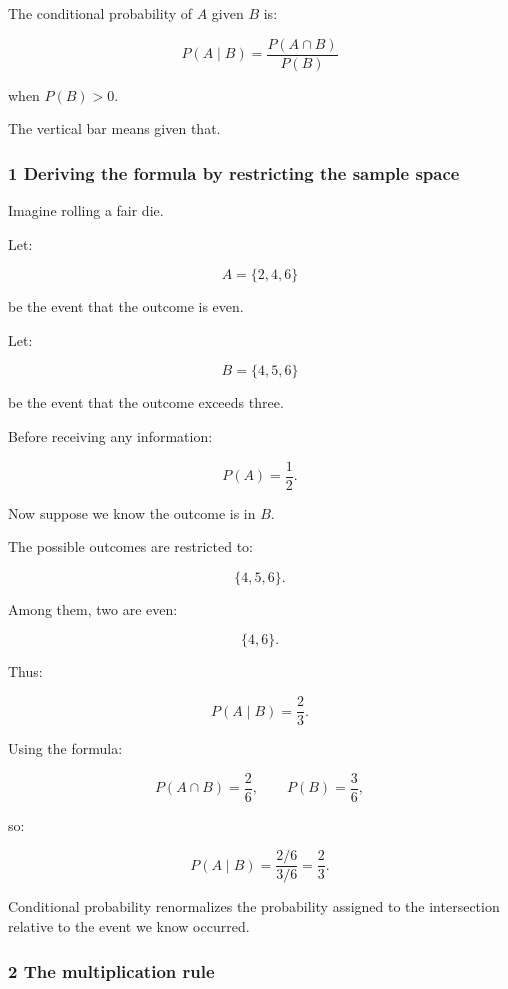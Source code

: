 The conditional probability of \(A\) given \(B\) is:

\[
 \boxed{ P(A\mid B) = \frac{P(A\cap B)}{P(B)} }
\]

when \(P(B)>0\).

The vertical bar means given that.

\subsubsection{1 Deriving the formula by restricting the sample space}\label{02-foundations-ii-ch023-deriving-the-formula-by-restricting-the-sample-space}

\hypertarget{02-foundations-ii-ch023-deriving-the-formula-by-restricting-the-sample-space}{}

Imagine rolling a fair die.

Let:

\[
 A=\{2,4,6\}
\]

be the event that the outcome is even.

Let:

\[
 B=\{4,5,6\}
\]

be the event that the outcome exceeds three.

Before receiving any information:

\[
 P(A)=\frac12.
\]

Now suppose we know the outcome is in \(B\).

The possible outcomes are restricted to:

\[
 \{4,5,6\}.
\]

Among them, two are even:

\[
 \{4,6\}.
\]

Thus:

\[
 P(A\mid B)=\frac23.
\]

Using the formula:

\[
 P(A\cap B)=\frac26, \qquad P(B)=\frac36,
\]

so:

\[
 P(A\mid B) = \frac{2/6}{3/6} =\boxed{\frac23}.
\]

Conditional probability renormalizes the probability assigned to the intersection relative to the event we know occurred.

\subsubsection{2 The multiplication rule}\label{02-foundations-ii-ch023-the-multiplication-rule}


